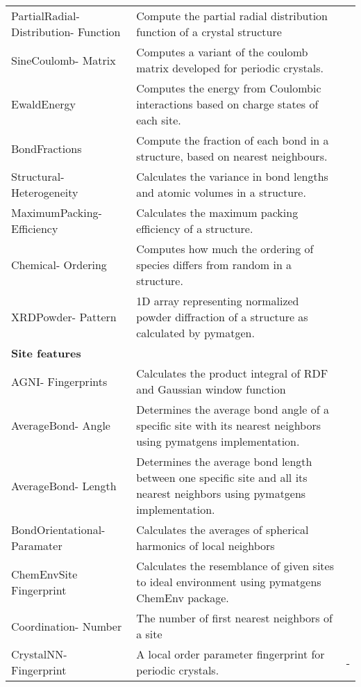 \begin{center}
\begin{longtable}{M{3.0cm} M{6.0cm} M{2.5cm}}
  PartialRadial- Distribution- Function & Compute the partial radial distribution function of a crystal structure & \cite{Schuett2014}  \\
  SineCoulomb- Matrix & Computes a variant of the coulomb matrix developed for periodic crystals. & \cite{Faber2015}  \\
  EwaldEnergy & Computes the energy from Coulombic interactions based on charge states of each site. & \cite{Ewald1921}  \\
  BondFractions & Compute the fraction of each bond in a structure, based on nearest neighbours. & \cite{Hansen2015}  \\
  Structural- Heterogeneity & Calculates the variance in bond lengths and atomic volumes in a structure. & \cite{Ward2017}  \\
  MaximumPacking- Efficiency & Calculates the maximum packing efficiency of a structure. & \cite{Ward2017} \\
  Chemical- Ordering & Computes how much the ordering of species differs from random in a structure. & \cite{Ward2017}  \\
  XRDPowder- Pattern & 1D array representing normalized powder diffraction of a structure as calculated by pymatgen. & \cite{Ong2013} \\
  \hline
  \textbf{Site features} & & \\
  \hline
  AGNI- Fingerprints & Calculates the product integral of RDF and Gaussian window function & \cite{Botu2014}  \\
  AverageBond- Angle & Determines the average bond angle of a specific site with its nearest neighbors using pymatgens implementation. & \cite{Jong2016}  \\
  AverageBond- Length & Determines the average bond length between one specific site and all its nearest neighbors using pymatgens implementation. & \cite{Jong2016}  \\
  BondOrientational- Paramater & Calculates the averages of spherical harmonics of local neighbors & \cite{Seko2017, Steinhardt1983}  \\
  ChemEnvSite Fingerprint & Calculates the resemblance of given sites to ideal environment using pymatgens ChemEnv package. & \cite{Waroquiers2017, Zimmermann2017}  \\
  Coordination- Number & The number of first nearest neighbors of a site & \cite{Zimmermann2017}  \\
  CrystalNN- Fingerprint & A local order parameter fingerprint for periodic crystals. & -  \\

\end{longtable}
\end{center}
